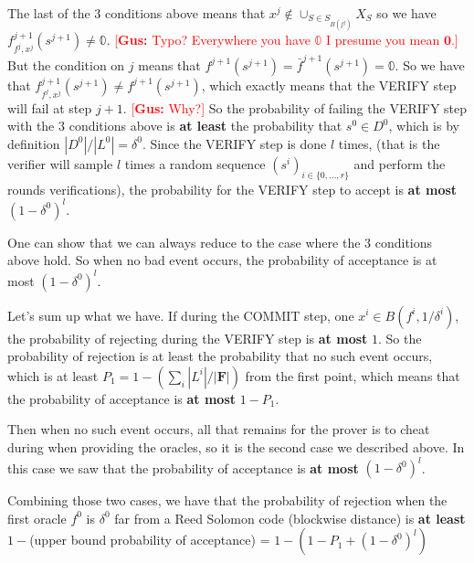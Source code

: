 \documentclass[12pt]{extarticle}
\newcommand{\<}{\langle}
\renewcommand{\>}{\rangle}
\theoremstyle{definition}
\newcommand{\gus}[1]{\textcolor{red}{[\textbf{Gus:} #1]}}
\begin{document}
The last of the $3$ conditions above means that $x^{j}\not\in\cup_{S\in S_{B(f^{j})}}X_S$ so we have $f^{j+1}_{f^j,x^j}(s^{j+1})\neq\mathbb{0}$.
\gus{Typo?  Everywhere you have $\mathbb{0}$ I presume you mean $\mathbf{0}$.}
But the condition on $j$ means that $f^{j+1}(s^{j+1})=\bar{f}^{j+1}(s^{j+1})=\mathbb{0}$. So we have that $f^{j+1}_{f^j,x^j}(s^{j+1})\neq f^{j+1}(s^{j+1})$, which exactly means that the VERIFY step will fail at step $j+1$. \gus{Why?} So the probability of failing the VERIFY step with the $3$ conditions above is \textbf{at least} the probability that $s^0\in D^0$, which is by definition $|D^0|/|L^0|=\delta^0$. Since the VERIFY step is done $l$ times, (that is the verifier will sample $l$ times a random sequence $(s^i)_{i\in\{0,\dots,r\}}$ and perform the rounds verifications), the probability for the VERIFY step to accept is \textbf{at most} $(1-\delta^0)^l$.

One can show that we can always reduce to the case where the $3$ conditions above hold. So when no bad event occurs, the probability of acceptance is at most $(1-\delta^0)^l$.

Let's sum up what we have. If during the COMMIT step, one $x^i\in B(f^i,1/\delta^i)$, the probability of rejecting during the VERIFY step is \textbf{at most} $1$. So the probability of rejection is at least the probability that no such event occurs, which is at least $P_1=1-(\sum_i|L^i|/|\mathbf{F}|)$ from the first point, which means that the probability of acceptance is \textbf{at most} $1-P_1$.

Then when no such event occurs, all that remains for the prover is to cheat during when providing the oracles, so it is the second case we described above. In this case we saw that the probability of acceptance is \textbf{at most} $(1-\delta^0)^l$.

Combining those two cases, we have that the probability of rejection when the first oracle $f^0$ is $\delta^0$ far from a Reed Solomon code (blockwise distance) is \textbf{at least} $1-$(upper bound probability of acceptance) = $1-(1-P_1 + (1-\delta^0)^l)$
\end{document}
